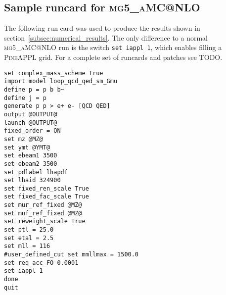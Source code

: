 \subsection{Sample runcard for \texorpdfstring{\textsc{mg5\_aMC@NLO}}{mg5\_aMC@NLO}}
\label{app:sample-runcard}

The following run card was used to produce the results shown in section~\ref{subsec:numerical_results}.
The only difference to a normal \textsc{mg5\_aMC@NLO} run is the switch \texttt{set iappl 1}, which enables filling a \textsc{PineAPPL} grid.
For a complete set of runcards and patches see TODO.


\begin{verbatim}
set complex_mass_scheme True
import model loop_qcd_qed_sm_Gmu
define p = p b b~
define j = p
generate p p > e+ e- [QCD QED]
output @OUTPUT@
launch @OUTPUT@
fixed_order = ON
set mz @MZ@
set ymt @YMT@
set ebeam1 3500
set ebeam2 3500
set pdlabel lhapdf
set lhaid 324900
set fixed_ren_scale True
set fixed_fac_scale True
set mur_ref_fixed @MZ@
set muf_ref_fixed @MZ@
set reweight_scale True
set ptl = 25.0
set etal = 2.5
set mll = 116
#user_defined_cut set mmllmax = 1500.0
set req_acc_FO 0.0001
set iappl 1
done
quit
\end{verbatim}
